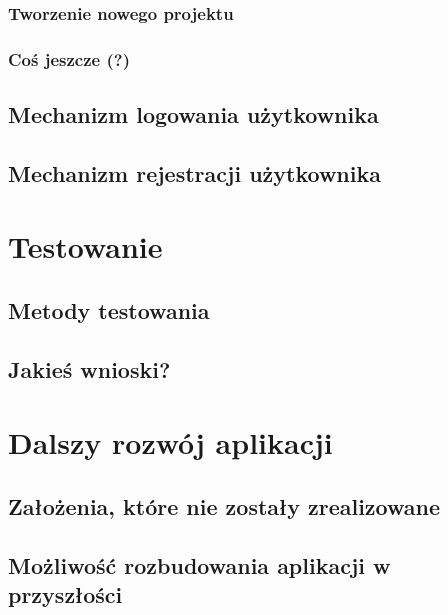 \documentclass[a4paper, 12pt, oneside]{article}
\begin{document}
			\subsubsection{Tworzenie nowego projektu}
			\subsubsection{Coś jeszcze (?)}
	\subsection{Mechanizm logowania użytkownika}
	\subsection{Mechanizm rejestracji użytkownika}
\section{Testowanie}
	\subsection{Metody testowania}
	\subsection{Jakieś wnioski?}
\section{Dalszy rozwój aplikacji}
	\subsection{Założenia, które nie zostały zrealizowane}
	\subsection{Możliwość rozbudowania aplikacji w przyszłości}
\end{document}
